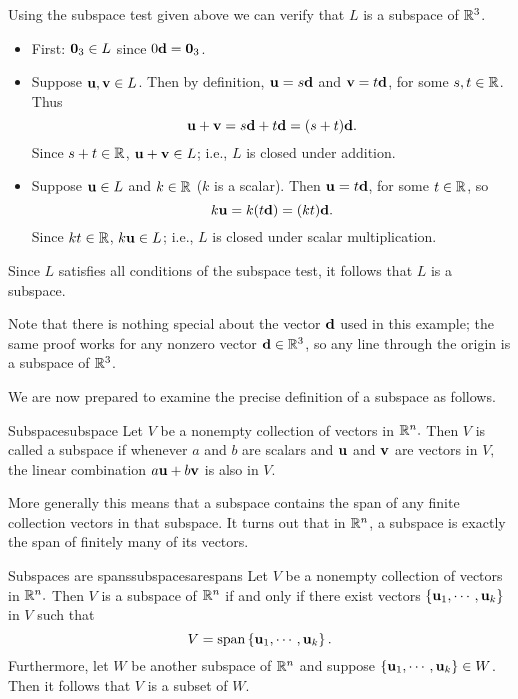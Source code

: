 \begin{solution}
Using the subspace test given above we can verify that $L$ is a subspace of $\mathbb{R}^3$. 
\begin{itemize}
\item First: ${\bf 0}_3\in L$ since $0{\bf d}={\bf 0}_3$.
\item Suppose ${\bf u},{\bf v}\in L$.
Then by definition, ${\bf u}=s{\bf d}$ and ${\bf v}=t{\bf d}$, 
for some $s,t\in\mathbb{R}$.
Thus
\[ {\bf u}+{\bf v} = s{\bf d}+t{\bf d} = (s+t){\bf d}.\]
Since $s+t\in\mathbb{R}$, ${\bf u}+{\bf v}\in L$;
i.e., $L$ is closed under addition.
\item Suppose ${\bf u}\in L$ and $k\in\mathbb{R}$ ($k$ is a scalar).
Then ${\bf u}=t{\bf d}$, for some $t\in\mathbb{R}$, so
\[ k{\bf u}=k(t{\bf d})=(kt){\bf d}.\]
Since $kt\in\mathbb{R}$, $k{\bf u}\in L$;
i.e., $L$ is closed under scalar multiplication.
\end{itemize}
Since $L$ satisfies all conditions of the subspace test, it follows that $L$ is a subspace. 
\end{solution}

Note that there is nothing special about the vector ${\bf d}$ used
in this example; the same proof works for any nonzero
vector ${\bf d}\in\mathbb{R}^3$, so any line through the origin is
a subspace of $\mathbb{R}^3$.

We are now prepared to examine the precise definition of a subspace as follows.

\begin{definition}{Subspace}{subspace}
Let $V$ be a nonempty collection of vectors in $\mathbb{R}^{n}.$ Then
$V$ is called a subspace if whenever $a$ and $b$  are scalars and ${\bf u}$ and ${\bf v}$
are vectors in $V,$ the linear combination $a {\bf u}+ b {\bf v}$ is also in $V$.
\end{definition}

More generally this means that a subspace contains the span of any
finite collection vectors in that subspace. It turns out that in
$\mathbb{R}^{n}$, a subspace is exactly the span of finitely many of
its vectors.

\begin{theorem}{Subspaces are spans}{subspacesarespans}
Let $V$ be a nonempty collection of vectors in $\mathbb{R}^{n}.$ Then $V$ is a subspace of $\mathbb{R}^{n}$ if and only if there
exist vectors $\left\{{\bf u}_{1},\cdots ,{\bf u}_{k}\right\}$ in $V$ such that 
\[
V= \mbox{span}\left\{{\bf u}_{1},\cdots ,{\bf u}_{k}\right\}. 
\]
Furthermore, let $W$ be another subspace of $\mathbb{R}^n$ and suppose $\left\{{\bf u}_{1},\cdots ,{\bf u}_{k}\right\} \in W$. Then it follows that $V$ is a subset of $W$. 
\end{theorem}

